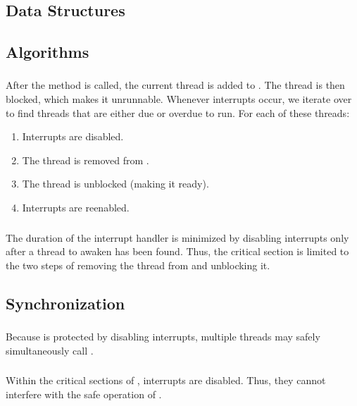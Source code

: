 \subsection{Data Structures}
	\subsubsection{}
	
\subsection{Algorithms}
	\subsubsection{}
		After the  method is called, the current thread is added to . The thread is then blocked, which makes it unrunnable. Whenever interrupts occur, we iterate over  to find threads that are either due or overdue to run. For each of these threads:
		\begin{enumerate}
			\item Interrupts are disabled.
			\item The thread is removed from .
			\item The thread is unblocked (making it ready).
			\item Interrupts are reenabled.
		\end{enumerate}
	\subsubsection{}
		The duration of the interrupt handler is minimized by disabling interrupts only after a thread to awaken has been found. Thus, the critical section is limited to the two steps of removing the thread from  and unblocking it.
\subsection{Synchronization}
	\subsubsection{}
		Because  is protected by disabling interrupts, multiple threads may safely simultaneously call .
	\subsubsection{}
		Within the critical sections of , interrupts are disabled. Thus, they cannot interfere with the safe operation of .
